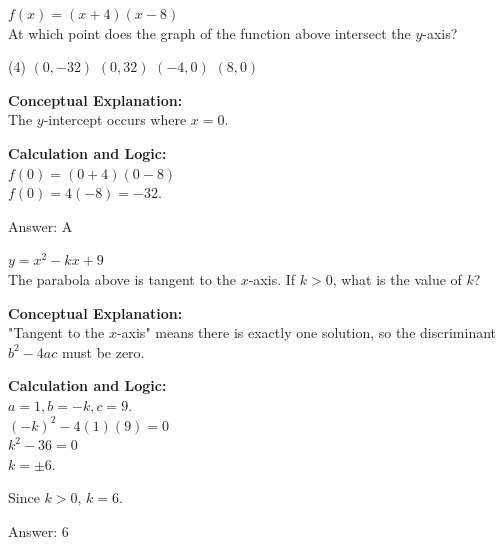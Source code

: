\documentclass[11pt,paper=a4,answers]{exam}
\begin{document}
\begin{questions}
\question
$f(x) = (x+4)(x-8)$ \\
At which point does the graph of the function above intersect the $y$-axis?
\begin{tasks}(4)
    \task $(0, -32)$
    \task $(0, 32)$
    \task $(-4, 0)$
    \task $(8, 0)$
\end{tasks}

\begin{solution}
\textbf{Conceptual Explanation:} \\
The $y$-intercept occurs where $x = 0$.

\vspace{20pt}

\textbf{Calculation and Logic:} \\
$f(0) = (0+4)(0-8)$ \\
$f(0) = 4(-8) = -32$.

\vspace{25pt}

Answer: \colorbox{yellow!100}{A}
\end{solution}

\vspace{40pt}

\question
$y = x^2 - kx + 9$ \\
The parabola above is tangent to the $x$-axis. If $k > 0$, what is the value of $k$?

\begin{solution}
\textbf{Conceptual Explanation:} \\
"Tangent to the $x$-axis" means there is exactly one solution, so the discriminant $b^2 - 4ac$ must be zero.

\vspace{20pt}

\textbf{Calculation and Logic:} \\
$a = 1, b = -k, c = 9$. \\
$(-k)^2 - 4(1)(9) = 0$ \\
$k^2 - 36 = 0$ \\
$k = \pm 6$.

\vspace{10pt}

Since $k > 0$, $k = 6$.

\vspace{25pt}

Answer: \colorbox{yellow!100}{6}
\end{solution}


\end{questions}
\end{document}

